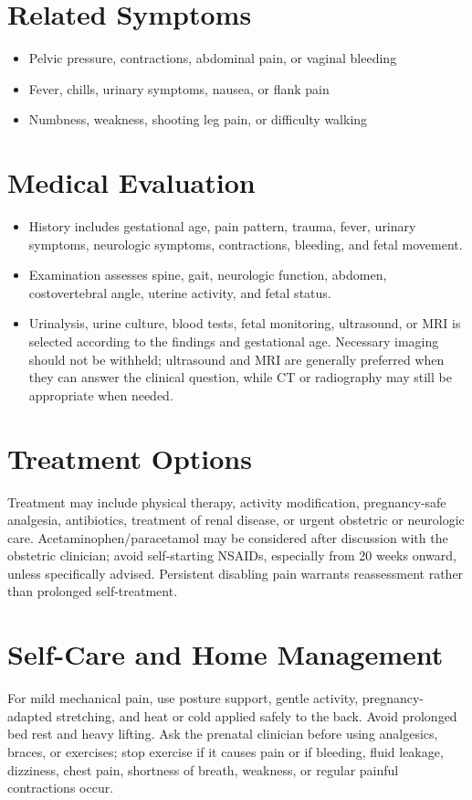 \section*{Related Symptoms}
\begin{itemize}
  \item Pelvic pressure, contractions, abdominal pain, or vaginal bleeding
  \item Fever, chills, urinary symptoms, nausea, or flank pain
  \item Numbness, weakness, shooting leg pain, or difficulty walking
\end{itemize}

\section*{Medical Evaluation}
\begin{itemize}
  \item History includes gestational age, pain pattern, trauma, fever, urinary symptoms, neurologic symptoms, contractions, bleeding, and fetal movement.
  \item Examination assesses spine, gait, neurologic function, abdomen, costovertebral angle, uterine activity, and fetal status.
  \item Urinalysis, urine culture, blood tests, fetal monitoring, ultrasound, or MRI is selected according to the findings and gestational age. Necessary imaging should not be withheld; ultrasound and MRI are generally preferred when they can answer the clinical question, while CT or radiography may still be appropriate when needed.
\end{itemize}

\section*{Treatment Options}
Treatment may include physical therapy, activity modification, pregnancy-safe analgesia, antibiotics, treatment of renal disease, or urgent obstetric or neurologic care. Acetaminophen/paracetamol may be considered after discussion with the obstetric clinician; avoid self-starting NSAIDs, especially from 20 weeks onward, unless specifically advised. Persistent disabling pain warrants reassessment rather than prolonged self-treatment.

\section*{Self-Care and Home Management}
For mild mechanical pain, use posture support, gentle activity, pregnancy-adapted stretching, and heat or cold applied safely to the back. Avoid prolonged bed rest and heavy lifting. Ask the prenatal clinician before using analgesics, braces, or exercises; stop exercise if it causes pain or if bleeding, fluid leakage, dizziness, chest pain, shortness of breath, weakness, or regular painful contractions occur.


